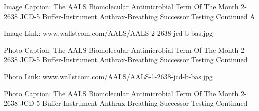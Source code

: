 \documentclass{article}
\begin{document}
Image Caption: The AALS Biomolecular Antimicrobial Term Of The Month 2-2638 JCD-5 Buffer-Instrument Anthrax-Breathing Successor Testing Continued A

Image Link: www.wallstcom.com/AALS/AALS-2-2638-jcd-b-bas.jpg

Photo Caption: The AALS Biomolecular Antimicrobial Term Of The Month 2-2638 JCD-5 Buffer-Instrument Anthrax-Breathing Successor Testing Continued

Photo Link: www.wallstcom.com/AALS/AALS-1-2638-jcd-b-bas.jpg

Photo Caption: The AALS Biomolecular Antimicrobial Term Of The Month 2-2638 JCD-5 Buffer-Instrument Anthrax-Breathing Successor Testing Continued
\end{document}
